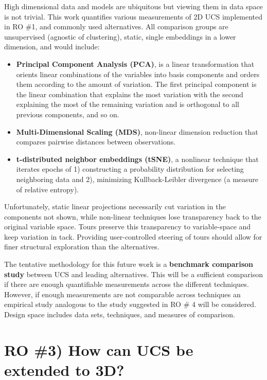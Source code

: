 \documentclass{monashthesis}
\begin{document}
High dimensional data and models are ubiquitous but viewing them in data
space is not trivial. This work quantifies various measurements of 2D
UCS implemented in RO \#1, and commonly used alternatives. All
comparison groups are unsupervised (agnostic of clustering), static,
single embeddings in a lower dimension, and would include:

\begin{itemize}
\tightlist
\item
  \textbf{Principal Component Analysis (PCA)}, is a linear
  transformation that orients linear combinations of the variables into
  basis components and orders them according to the amount of variation.
  The first principal component is the linear combination that explains
  the most variation with the second explaining the most of the
  remaining variation and is orthogonal to all previous components, and
  so on.
\item
  \textbf{Multi-Dimensional Scaling (MDS)}, non-linear dimension
  reduction that compares pairwise distances between observations.
\item
  \textbf{t-distributed neighbor embeddings (tSNE)}, a nonlinear
  technique that iterates epochs of 1) constructing a probability
  distribution for selecting neighboring data and 2), minimizing
  Kullback-Leibler divergence (a measure of relative entropy).
\end{itemize}

Unfortunately, static linear projections necessarily cut variation in
the components not shown, while non-linear techniques lose transparency
back to the original variable space. Tours preserve this transparency to
variable-space and keep variation in tack. Providing user-controlled
steering of tours should allow for finer structural exploration than the
alternatives.

The tentative methodology for this future work is a \textbf{benchmark
comparison study} between UCS and leading alternatives. This will be a
sufficient comparison if there are enough quantifiable measurements
across the different techniques. However, if enough measurements are not
comparable across techniques an empirical study analogous to the study
suggested in RO \# 4 will be considered. Design space includes data
sets, techniques, and measures of comparison.

\section{RO \#3) How can UCS be extended to
3D?}\label{ro-3-how-can-ucs-be-extended-to-3d}
\end{document}
